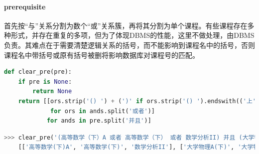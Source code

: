 \paragraph{prerequisite}
首先按“与”关系分割为数个“或”关系簇，再将其分割为单个课程。有些课程存在多种形式，并存在重复的多项，但为了体现DBMS的性能，这里不做处理，由DBMS负责。其难点在于需要清楚逻辑关系的括号，而不能影响到课程名中的括号，否则课程名中带括号或原有括号被删将影响数据库对课程号的匹配。
\begin{lstlisting}[language=python]
def clear_pre(pre):
    if pre is None:
        return None
    return [[ors.strip('() ') + (')' if ors.strip('() ').endswith(('上', '下')) else '')
             for ors in ands.split('或者')]
            for ands in pre.split('并且')]
\end{lstlisting}
\vspace{-3em}
\begin{lstlisting}[language=python]
>>> clear_pre('(高等数学（下）A 或者 高等数学（下） 或者 数学分析II) 并且 (大学物理A(下) 或者 大学物理 B(下) 或者 大学物理A（下）) 并且 (线性代数I-A 或者 线性代数I)')
    [['高等数学(下)A', '高等数学(下)', '数学分析II'], ['大学物理A(下)', '大学物理 B(下)', '大学物理A(下)'], ['线性代数I-A', '线性代数I']]
\end{lstlisting}
\vspace{-3em}

